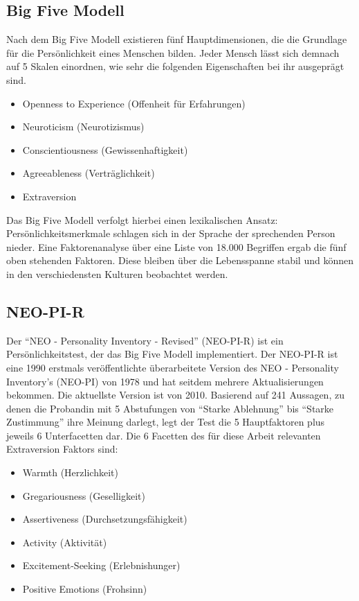 \subsection{Big Five Modell}

Nach dem Big Five Modell existieren fünf Hauptdimensionen, die die Grundlage für die Persönlichkeit eines Menschen bilden.
Jeder Mensch lässt sich demnach auf 5 Skalen einordnen, wie sehr die folgenden Eigenschaften bei ihr ausgeprägt sind.

\begin{itemize}
  \item Openness to Experience (Offenheit für Erfahrungen)
  \item Neuroticism (Neurotizismus)
  \item Conscientiousness (Gewissenhaftigkeit)
  \item Agreeableness (Verträglichkeit)
  \item Extraversion
\end{itemize}

Das Big Five Modell verfolgt hierbei einen lexikalischen Ansatz: 
Persönlichkeitsmerkmale schlagen sich in der Sprache der sprechenden Person nieder.
Eine Faktorenanalyse über eine Liste von 18.000 Begriffen ergab die fünf oben stehenden Faktoren.
Diese bleiben über die Lebensspanne stabil und können in den verschiedensten Kulturen beobachtet werden.

\subsection{NEO-PI-R}

Der "`NEO - Personality Inventory - Revised"' (NEO-PI-R) ist ein Persönlichkeitstest, der das Big Five Modell implementiert.
Der NEO-PI-R ist eine 1990 erstmals veröffentlichte überarbeitete Version des NEO - Personality Inventory's (NEO-PI) von 1978 und hat seitdem mehrere Aktualisierungen bekommen. Die aktuellste Version ist von 2010.
Basierend auf 241 Aussagen, zu denen die Probandin mit 5 Abstufungen von "`Starke Ablehnung"' bis "`Starke Zustimmung"' ihre Meinung darlegt, legt der Test die 5 Hauptfaktoren plus jeweils 6 Unterfacetten dar.
Die 6 Facetten des für diese Arbeit relevanten Extraversion Faktors sind:

\begin{itemize}
  \item Warmth (Herzlichkeit)
  \item Gregariousness (Geselligkeit)
  \item Assertiveness (Durchsetzungsfähigkeit)
  \item Activity (Aktivität)
  \item Excitement-Seeking (Erlebnishunger)
  \item Positive Emotions (Frohsinn)
\end{itemize}

